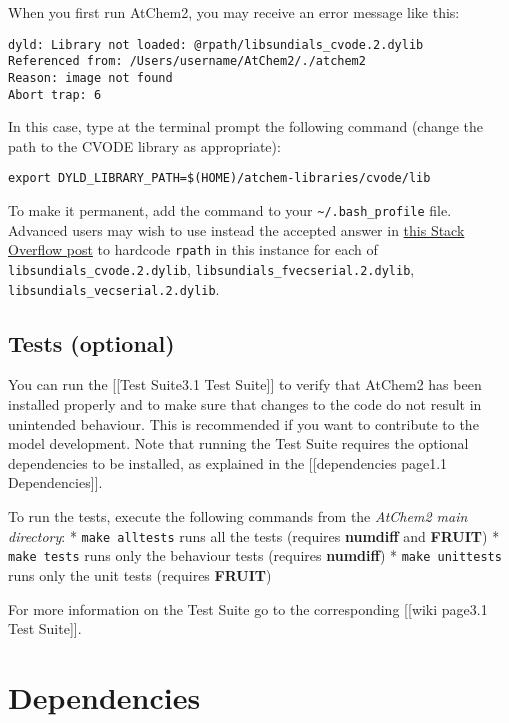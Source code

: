 When you first run AtChem2, you may receive an error message like this:

\begin{verbatim}
dyld: Library not loaded: @rpath/libsundials_cvode.2.dylib
Referenced from: /Users/username/AtChem2/./atchem2
Reason: image not found
Abort trap: 6
\end{verbatim}

In this case, type at the terminal prompt the following command (change
the path to the CVODE library as appropriate):

\begin{verbatim}
export DYLD_LIBRARY_PATH=$(HOME)/atchem-libraries/cvode/lib
\end{verbatim}

To make it permanent, add the command to your
\texttt{\textasciitilde{}/.bash\_profile} file. Advanced users may wish
to use instead the accepted answer in
\href{https://stackoverflow.com/questions/17703510/dyld-library-not-loaded-reason-image-not-loaded}{this
Stack Overflow post} to hardcode \texttt{rpath} in this instance for
each of \texttt{libsundials\_cvode.2.dylib},
\texttt{libsundials\_fvecserial.2.dylib},
\texttt{libsundials\_vecserial.2.dylib}.

\subsection{Tests (optional)} \label{tests-optional}

You can run the {[}{[}Test Suite\textbar{}3.1 Test Suite{]}{]} to verify
that AtChem2 has been installed properly and to make sure that changes
to the code do not result in unintended behaviour. This is recommended
if you want to contribute to the model development. Note that running
the Test Suite requires the optional dependencies to be installed, as
explained in the {[}{[}dependencies page\textbar{}1.1
Dependencies{]}{]}.

To run the tests, execute the following commands from the \emph{AtChem2
main directory}: * \texttt{make\ alltests} runs all the tests (requires
\textbf{numdiff} and \textbf{FRUIT}) * \texttt{make\ tests} runs only
the behaviour tests (requires \textbf{numdiff}) *
\texttt{make\ unittests} runs only the unit tests (requires
\textbf{FRUIT})

For more information on the Test Suite go to the corresponding
{[}{[}wiki page\textbar{}3.1 Test Suite{]}{]}.

\section{Dependencies} \label{sec:dependencies}

